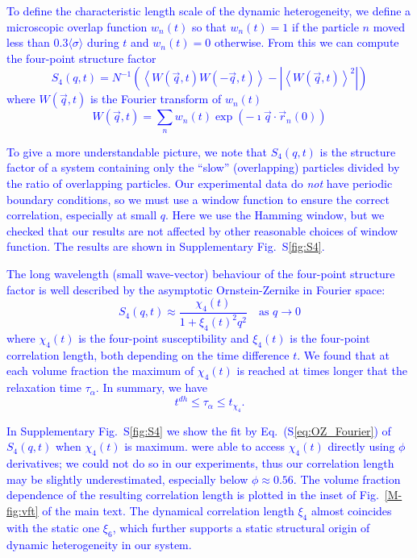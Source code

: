 \documentclass[prl,twocolumn,notitlepage]{revtex4-1}
\begin{document}
\textcolor{blue}{To define the characteristic length scale of the dynamic heterogeneity, we define a microscopic overlap function $w_n(t)$ so that $w_n(t)=1$ if the particle $n$ moved less than $0.3\langle\sigma\rangle$ during $t$ and $w_n(t)=0$ otherwise. From this we can compute the four-point structure factor~\cite{Flenner2011}
\begin{equation}
	S_4(q,t) = N^{-1}(\left\langle W(\vec{q},t) W(-\vec{q},t) \right\rangle - | \left\langle W(\vec{q},t) \right\rangle^2 |)
	\label{eq:S4}
\end{equation}
where $W(\vec{q},t)$ is the Fourier transform of $w_n(t)$
\begin{equation}
	W(\vec{q},t) = \sum_n w_n(t)\exp(-\imath \vec{q}\cdot\vec{r}_n(0))
\end{equation}}

\textcolor{blue}{To give a more understandable picture, we note that $S_4(q,t)$ is the structure factor of a system containing only the ``slow'' (overlapping) particles divided by the ratio of overlapping particles. Our experimental data do \emph{not} have periodic boundary conditions, so we must use a window function to ensure the correct correlation, especially at small $q$. Here we use the Hamming window, but we checked that our results are not affected by other reasonable choices of window function. The results are shown in Supplementary Fig.~S\ref{fig:S4}.}

\textcolor{blue}{The long wavelength (small wave-vector) behaviour of the four-point structure factor is well described by the asymptotic Ornstein-Zernike in Fourier space:
\begin{equation}
	S_4(q,t) \approx \frac{\chi_4(t)}{1+\xi_4(t)^2 q^2} \quad \text{as } q\rightarrow 0
	\label{eq:OZ_Fourier}
\end{equation}
where $\chi_4(t)$ is the four-point susceptibility and $\xi_4(t)$ is the four-point correlation length, both depending on the time difference $t$. We found that at each volume fraction the maximum of $\chi_4(t)$ is reached at times longer that the relaxation time $\tau_\alpha$. In summary, we have
\begin{equation}
t^{dh} \leq \tau_\alpha \leq t_{\chi_4}.
\end{equation}}

\textcolor{blue}{In Supplementary Fig.~S\ref{fig:S4} we show the fit by Eq.~(S\ref{eq:OZ_Fourier}) of $S_4(q,t)$ when $\chi_4(t)$ is maximum. \citet{Flenner2011} were able to access $\chi_4(t)$ directly using $\phi$ derivatives; we could not do so in our experiments, thus our correlation length may be slightly underestimated, especially below $\phi\approx 0.56$. The volume fraction dependence of the resulting correlation length is plotted in the inset of Fig.~\ref{M-fig:vft} of the main text. 
The dynamical correlation length $\xi_4$ almost coincides with the static one $\xi_6$, which further supports a static structural origin of dynamic heterogeneity in our system. }
\end{document}

